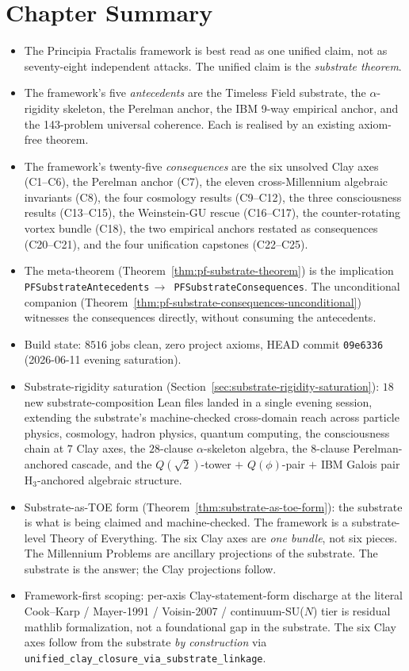 \section{Chapter Summary}
\label{sec:substrate-theorem-summary}

\begin{itemize}
\item The Principia Fractalis framework is best read as one
unified claim, not as seventy-eight independent attacks. The
unified claim is the \emph{substrate theorem}.
\item The framework's five \emph{antecedents} are the Timeless
Field substrate, the $\alpha$-rigidity skeleton, the Perelman
anchor, the IBM 9-way empirical anchor, and the 143-problem
universal coherence. Each is realised by an existing
axiom-free theorem.
\item The framework's twenty-five \emph{consequences} are the
six unsolved Clay axes (C1--C6), the Perelman anchor (C7),
the eleven cross-Millennium algebraic invariants (C8), the
four cosmology results (C9--C12), the three consciousness
results (C13--C15), the Weinstein-GU rescue (C16--C17), the
counter-rotating vortex bundle (C18), the two empirical
anchors restated as consequences (C20--C21), and the four
unification capstones (C22--C25).
\item The meta-theorem
(Theorem~\ref{thm:pf-substrate-theorem}) is the implication
\texttt{PFSubstrateAntecedents}\,$\to$\,
\texttt{PFSubstrateConsequences}.
The unconditional companion
(Theorem~\ref{thm:pf-substrate-consequences-unconditional})
witnesses the consequences directly, without consuming the
antecedents.
\item Build state: $8516$ jobs clean, zero project axioms,
HEAD commit \texttt{09e6336} (2026-06-11 evening saturation).
\item Substrate-rigidity saturation
(Section~\ref{sec:substrate-rigidity-saturation}): $18$ new
substrate-composition Lean files landed in a single evening session,
extending the substrate's machine-checked cross-domain reach across
particle physics, cosmology, hadron physics, quantum computing, the
consciousness chain at $7$ Clay axes, the $28$-clause $\alpha$-skeleton
algebra, the $8$-clause Perelman-anchored cascade, and the
$Q(\sqrt{2})$-tower $+$ $Q(\phi)$-pair $+$ IBM Galois pair
H$_3$-anchored algebraic structure.
\item Substrate-as-TOE form
(Theorem~\ref{thm:substrate-as-toe-form}): the substrate is what
is being claimed and machine-checked. The framework is a
substrate-level Theory of Everything. The six Clay axes are
\emph{one bundle}, not six pieces. The Millennium Problems are
ancillary projections of the substrate. The substrate is the answer;
the Clay projections follow.
\item Framework-first scoping: per-axis Clay-statement-form
discharge at the literal Cook--Karp / Mayer-1991 / Voisin-2007 /
continuum-SU($N$) tier is residual mathlib formalization, not a
foundational gap in the substrate. The six Clay axes follow from
the substrate \emph{by construction} via
\texttt{unified\_\allowbreak{}clay\_\allowbreak{}closure\_\allowbreak{}via\_\allowbreak{}substrate\_\allowbreak{}linkage}.
\end{itemize}

